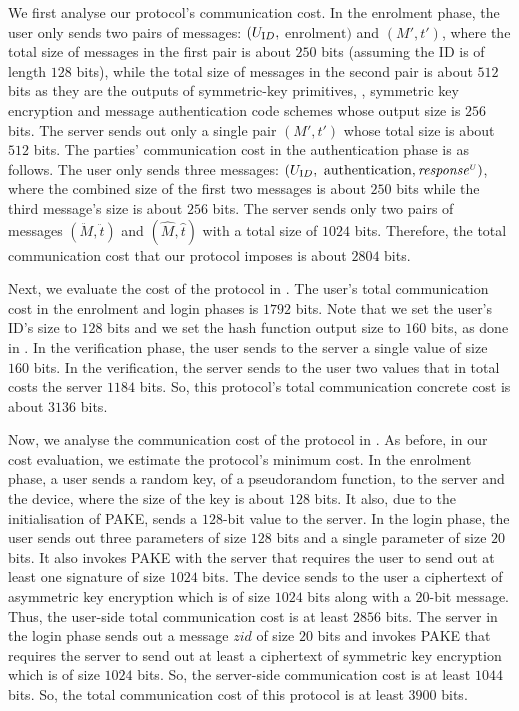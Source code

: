 We first analyse our protocol's communication cost. In the enrolment phase,  the user only sends two pairs of messages: $(U_{\text ID}, $ $\text{enrolment})$ and $(M', t')$, where the total size of messages in the first pair is about $250$ bits (assuming the ID is of length $128$ bits),  while the total size of messages in the second pair is about  $512$ bits as they are the outputs of symmetric-key primitives, \ie, symmetric key encryption and message authentication code schemes whose output size is $256$ bits. The server sends out only a single pair $(M', t')$ whose total size is about $512$ bits. 
% 
The parties' communication cost in the authentication phase is as follows. The user only sends three messages: $(U_{\text ID}, $ $\text{authentication}, \mathit{response}^{\scriptscriptstyle U})$, where the combined size of the first two messages is about $250$ bits while the third message's size is about $256$ bits. The server sends only two pairs of messages $(\ddot M, \ddot t)$ and $(\hat M, \hat t)$ with a total size of $1024$ bits. Therefore, the total communication cost that our protocol imposes is about $2804$ bits. 

Next, we evaluate the cost of the protocol in \cite{WangW18}. The user's total communication cost in the enrolment and login phases is $1792$ bits. Note that we set the user's ID's size to $128$ bits and we set the hash function output size to $160$ bits, as done in \cite{WangW18}. In the verification phase, the user sends to the server a single value of size $160$ bits. In the verification, the server sends to the user two values that in total costs the server $1184$ bits. So, this protocol's total communication concrete cost is about $3136$ bits.%


Now, we analyse the communication cost of the protocol in \cite{JareckiJKSS21}. As before, in our cost evaluation, we estimate the protocol's minimum cost.  In the enrolment phase, a user sends a random key, of a pseudorandom function, to the server and the device, where the size of the key is about $128$ bits. It also, due to the initialisation of PAKE, sends a $128$-bit value to the server. In the login phase, the user sends out three parameters of size $128$ bits and a single parameter of size $20$ bits.  It also invokes PAKE with the server that requires the user to send out at least one signature of size $1024$ bits. The device sends to the user a ciphertext of asymmetric key encryption which is of size $1024$ bits along with a $20$-bit message. Thus, the user-side total communication cost is at least $2856$ bits. The server in the login phase sends out a message $zid$ of size $20$ bits and invokes PAKE that requires the server to send out at least a ciphertext of symmetric key encryption which is of size $1024$ bits.  So, the server-side communication cost is at least $1044$ bits. So, the total communication cost of this protocol is at least $3900$ bits. 






